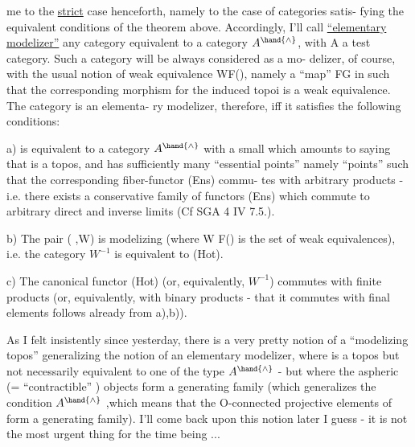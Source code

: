me to the \uline{strict} case henceforth,  namely to the case of categories satis-%
fying the equivalent conditions of the theorem above. Accordingly, I'll
call \uline{``elementary modelizer''} any category  equivalent to a category $A^{\hand{\wedge}}$,
with A a test category.  Such a category will be always considered as a mo-%
delizer, of course,  with the usual notion of weak equivalence W\hand{$\subset$}F(),
namely  a ``map''  F\hand{$\to$}G in  such that the corresponding morphism for the
induced topoi is a weak equivalence.  The  category  is an elementa-%
ry modelizer,  therefore,  iff it satisfies the following conditions:

a)  is equivalent to a category $A^{\hand{\wedge}}$ with a small  which amounts to
saying that  is a topos,  and has sufficiently many ``essential points''
namely ``points'' such that the corresponding fiber-functor  (Ens) commu-%
tes with arbitrary products  -  i.e. there exists a conservative family
of functors   (Ens)  which commute to arbitrary direct and inverse
limits (Cf SGA 4 IV 7.5.).

b)  The pair ( ,W) is modelizing (where W \hand{$\subset$} F() is the set of weak
equivalences),  i.e. the category  $W^{-1}$  is equivalent to (Hot).

c)  The canonical functor  (Hot)  (or, equivalently,  $W^{-1}$)
commutes with finite products (or, equivalently,  with binary products -
that it commutes with final elements follows already from a),b)).

As I felt insistently since yesterday,  there is a very pretty notion
of a ``modelizing topos'' generalizing the notion of an elementary modelizer,
where  is a topos but not necessarily equivalent to one of the type $A^{\hand{\wedge}}$
-  but  where  the aspheric (= ``contractible'' ) objects form a
generating family (which generalizes the condition $A^{\hand{\wedge}}$ ,which means
that the O-connected projective elements of  form a generating family).
I'll come back upon this notion later I guess -  it is not the most urgent
thing for the time being ...

